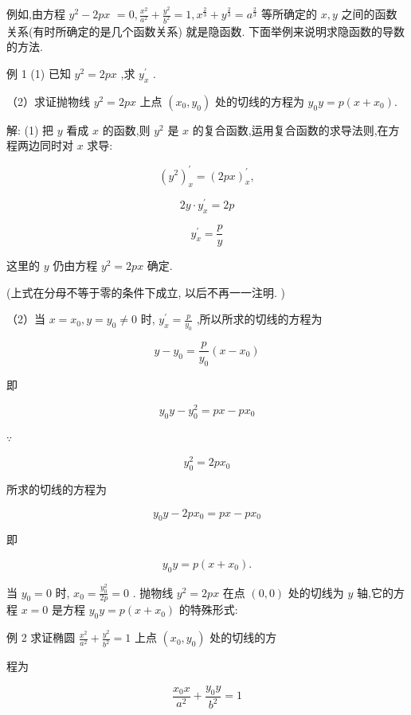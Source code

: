 \documentclass[lang=cn,newtx,12pt,scheme=chinese]{elegantbook}
\begin{document}
例如,由方程 \({y}^{2} - {2px}\) \(= 0,\frac{{x}^{2}}{{a}^{2}} + \frac{{y}^{2}}{{b}^{2}} = 1,{x}^{\frac{2}{3}} + {y}^{\frac{2}{3}} = {a}^{\frac{2}{3}}\) 等所确定的 \(x,y\) 之间的函数关系(有时所确定的是几个函数关系) 就是隐函数. 下面举例来说明求隐函数的导数的方法.

例 1 (1) 已知 \({y}^{2} = {2px}\) ,求 \({y}_{x}^{\prime }\) .

（2）求证抛物线 \({y}^{2} = {2px}\) 上点 \(\left( {{x}_{0},{y}_{0}}\right)\) 处的切线的方程为 \({y}_{0}y = p\left( {x + {x}_{0}}\right) .\)

解: (1) 把 \(y\) 看成 \(x\) 的函数,则 \({y}^{2}\) 是 \(x\) 的复合函数,运用复合函数的求导法则,在方程两边同时对 \(x\) 求导:

\[
{\left( {y}^{2}\right) }_{x}^{\prime } = {\left( 2px\right) }_{x}^{\prime },
\]

\[
{2y} \cdot {y}_{x}^{\prime } = {2p}
\]

\[
{y}_{x}^{\prime } = \frac{p}{y}
\]

这里的 \(y\) 仍由方程 \({y}^{2} = {2px}\) 确定.

(上式在分母不等于零的条件下成立, 以后不再一一注明. )

（2）当 \(x = {x}_{0},y = {y}_{0} \neq 0\) 时, \({y}_{x}^{\prime } = \frac{p}{{y}_{0}}\) ,所以所求的切线的方程为

\[
y - {y}_{0} = \frac{p}{{y}_{0}}\left( {x - {x}_{0}}\right)
\]

即

\[
{y}_{0}y - {y}_{0}^{2} = {px} - p{x}_{0}
\]

\(\because\)

\[
{y}_{0}^{2} = {2p}{x}_{0}
\]

所求的切线的方程为

\[
{y}_{0}y - {2p}{x}_{0} = {px} - p{x}_{0}
\]

即

\[
{y}_{0}y = p\left( {x + {x}_{0}}\right) .
\]

当 \({y}_{0} = 0\) 时, \({x}_{0} = \frac{{y}_{0}^{2}}{2p} = 0\) . 抛物线 \({y}^{2} = {2px}\) 在点 \(\left( {0,0}\right)\) 处的切线为 \(y\) 轴,它的方程 \(x = 0\) 是方程 \({y}_{0}y = p\left( {x + {x}_{0}}\right)\) 的特殊形式:

例 2 求证椭圆 \(\frac{{x}^{2}}{{a}^{2}} + \frac{{y}^{2}}{{b}^{2}} = 1\) 上点 \(\left( {{x}_{0},{y}_{0}}\right)\) 处的切线的方

程为

\[
\frac{{x}_{0}x}{{a}^{2}} + \frac{{y}_{0}y}{{b}^{2}} = 1
\]
\end{document}
